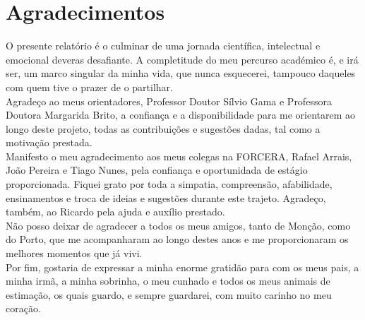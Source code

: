 \chapter*{Agradecimentos}
\label{Chp:Acknowledgements}
\vspace{-3em}



O presente relatório é o culminar de uma jornada científica, intelectual e emocional deveras desafiante. A completitude do meu percurso académico é, e irá ser, um marco singular da minha vida, que nunca esquecerei, tampouco daqueles com quem tive o prazer de o partilhar. \\ 



Agradeço ao meus orientadores, Professor Doutor Sílvio Gama e Professora Doutora Margarida Brito, a confiança e a disponibilidade para me orientarem ao longo deste projeto, todas as contribuições e sugestões dadas, tal como a motivação prestada.\\



Manifesto o meu agradecimento aos meus colegas na FORCERA, Rafael Arrais, João Pereira e Tiago Nunes, pela confiança e oportunidada de estágio proporcionada. Fiquei grato por toda a simpatia, compreensão, afabilidade, ensinamentos e troca de ideias e sugestões durante este trajeto. Agradeço, também, ao Ricardo pela ajuda e auxílio prestado.\\



Não posso deixar de agradecer a todos os meus amigos, tanto de Monção, como do Porto, que me acompanharam ao longo destes anos e me proporcionaram os melhores momentos que já vivi. \\



Por fim, gostaria de expressar a minha enorme gratidão para com os meus pais, a minha irmã, a minha sobrinha, o meu cunhado e todos os meus animais de estimação, os quais guardo, e sempre guardarei, com muito carinho no meu coração. 




